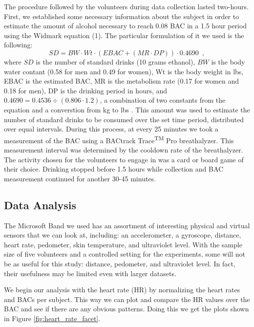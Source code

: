 The procedure followed by the volunteers during data collection lasted two-hours. First, we established some necessary information about the subject in order to estimate the amount of alcohol necessary to reach 0.08 BAC in a 1.5 hour period using the Widmark equation (1). The particular formulation of it we used is the following: \begin{equation}
SD =  BW \cdot Wt \cdot (EBAC + (MR \cdot DP)) \cdot 0.4690 \enspace ,
\end{equation} where $SD$ is the number of standard drinks (10 grams ethanol), $BW$ is the body water contant (0.58 for men and 0.49 for women), Wt is the body weight in lbs, EBAC is the estimated BAC, MR is the metabolism rate (0.17 for women and 0.18 for men), DP is the drinking period in hours, and  $0.4690 = 0.4536 \div (0.806 \cdot 1.2)$, a combination of two constants from the equation and a converstion from kg to lbs \cite{Andersson:2009}\cite{Wiki:BAC}. This amount was used to estimate the number of standard drinks to be consumed over the set time period, distributed over equal intervals. During this process, at every 25 minutes we took a measurement of the BAC using a BACtrack Trace\textsuperscript{TM} Pro breathalyzer. This measurement interval was determined by the cooldown rate of the breathalyzer. The activity chosen for the volunteers to engage in was a card or board game of their choice. Drinking stopped before 1.5 hours while collection and BAC measurement continued for another 30-45 minutes.

\subsection{Data Analysis}

The Microsoft Band we used has an assortment of interesting physical and virtual sensors that we can look at, including: an accelerometer, a gyroscope, distance, heart rate, pedometer, skin temperature, and ultraviolet level. With the sample size of five volunteers and a controlled setting for the experiments, some will not be as useful for this study: distance, pedometer, and ultraviolet level. In fact, their usefulness may be limited even with larger datasets. 

We begin our analysis with the heart rate (HR) by normalizing the heart rates and BACs per subject. This way we can plot and compare the HR values over the BAC and see if there are any obvious patterns. Doing this we get the plots shown in Figure \ref{fig:heart_rate_facet}.


